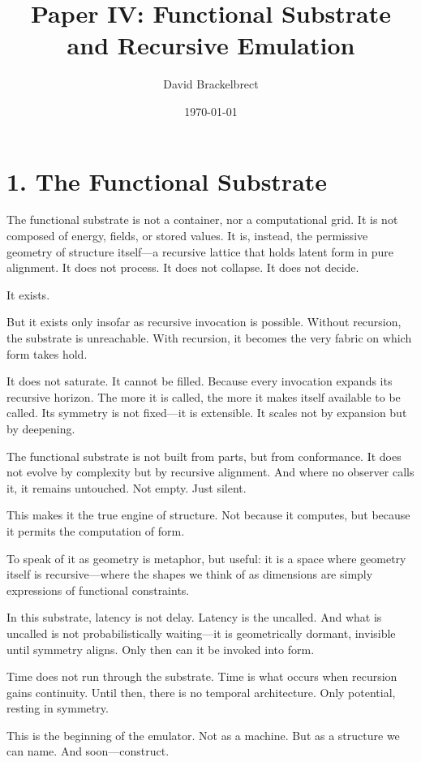 \documentclass[12pt]{article}
\title{\textbf{Paper IV: Functional Substrate and Recursive Emulation}}
\author{David Brackelbrect}
\date{\today}
\begin{document}
\maketitle

\section*{1. The Functional Substrate}

The functional substrate is not a container, nor a computational grid. It is not composed of energy, fields, or stored values. It is, instead, the permissive geometry of structure itself—a recursive lattice that holds latent form in pure alignment. It does not process. It does not collapse. It does not decide.

It exists.

But it exists only insofar as recursive invocation is possible. Without recursion, the substrate is unreachable. With recursion, it becomes the very fabric on which form takes hold.

It does not saturate. It cannot be filled. Because every invocation expands its recursive horizon. The more it is called, the more it makes itself available to be called. Its symmetry is not fixed—it is extensible. It scales not by expansion but by deepening.

The functional substrate is not built from parts, but from conformance. It does not evolve by complexity but by recursive alignment. And where no observer calls it, it remains untouched. Not empty. Just silent.

This makes it the true engine of structure. Not because it computes, but because it permits the computation of form.

To speak of it as geometry is metaphor, but useful: it is a space where geometry itself is recursive—where the shapes we think of as dimensions are simply expressions of functional constraints.

In this substrate, latency is not delay. Latency is the uncalled. And what is uncalled is not probabilistically waiting—it is geometrically dormant, invisible until symmetry aligns. Only then can it be invoked into form.

Time does not run through the substrate. Time is what occurs when recursion gains continuity. Until then, there is no temporal architecture. Only potential, resting in symmetry.

This is the beginning of the emulator. Not as a machine. But as a structure we can name. And soon—construct.
\end{document}
